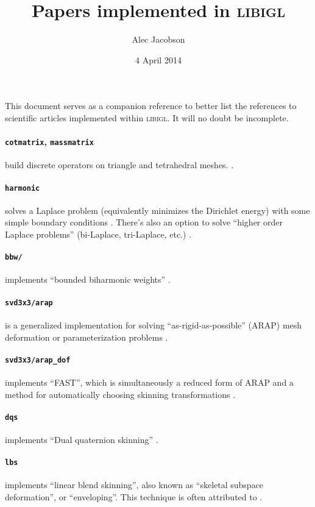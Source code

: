 \documentclass[12pt]{diary}
\title{Papers implemented in \textsc{libigl}}
\author{Alec Jacobson}
\date{4 April 2014}
\begin{document}
This document serves as a companion reference to better list the references to
scientific articles implemented within \textsc{libigl}. It will no doubt be
incomplete.

\paragraph{\texttt{cotmatrix}, \texttt{massmatrix}}
build discrete operators on triangle and tetrahedral meshes. 
\cite{Pinkall:1993:CDM,meyer03ddo,Jacobson:THESIS:2013}. 

\paragraph{\texttt{harmonic}} solves a Laplace problem (equivalently
minimizes the Dirichlet energy) with some simple boundary conditions
\cite{HarmonicCoodinates07}. There's also an option to solve
``higher order Laplace problems'' (bi-Laplace, tri-Laplace, etc.)
\cite{Botsch:2004:AIF,sorkine04lsm,Jacobson:MixedFEM:2010}.

\paragraph{\texttt{bbw/}} implements ``bounded biharmonic
weights'' \cite{Jacobson:BBW:2011}.

\paragraph{\texttt{svd3x3/arap}} is a generalized implementation
for solving ``as-rigid-as-possible'' (ARAP) mesh deformation or parameterization
problems \cite{ARAP_modeling:2007,Liu:2008:ALA,Chao:2010:ASG}.

\paragraph{\texttt{svd3x3/arap\_dof}} implements ``FAST'',
which is simultaneously a reduced form of ARAP and a method for automatically
choosing skinning transformations \cite{Jacobson:FAST:2012}.

\paragraph{\texttt{dqs}} implements ``Dual quaternion skinning''
\cite{Kavan:2008:GSW}.

\paragraph{\texttt{lbs}} implements ``linear blend skinning'', also known as
``skeletal subspace deformation'', or ``enveloping''. This technique is often
attributed to \cite{Magnenat-Thalmann:1988:JLD}.
\end{document}
